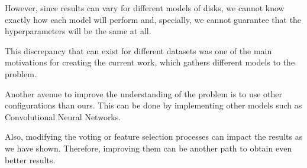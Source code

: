However, since results can vary for different models of disks, we cannot know exactly how each model will perform and, specially, we cannot guarantee that the hyperparameters will be the same at all.

This discrepancy that can exist for different datasets was one of the main motivations for creating the current work, which gathers different models to the problem.

Another avenue to improve the understanding of the problem is to use other configurations than ours.
This can be done by implementing other models such as Convolutional Neural Networks.

Also, modifying the voting or feature selection processes can impact the results as we have shown.
Therefore, improving them can be another path to obtain even better results.